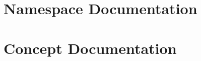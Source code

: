 \documentclass[twoside]{book}
\newcommand{\+}{\discretionary{\mbox{\scriptsize$\hookleftarrow$}}{}{}}
\begin{document}
\chapter{Namespace Documentation}
















\chapter{Concept Documentation}

\end{document}
